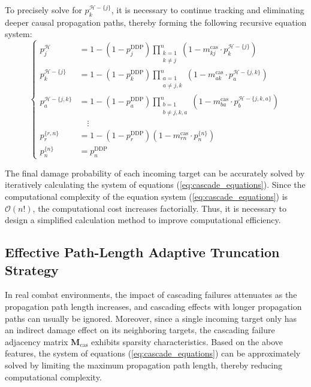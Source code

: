 \documentclass[lettersize,journal]{IEEEtran}
\begin{document}
To precisely solve for $p_k^{\mathcal{H}-\{j\}}$, it is necessary to continue tracking and eliminating deeper causal propagation paths, thereby forming the following recursive equation system:
\begin{equation}
\left\{
\begin{aligned}
p_j^{\mathcal{H}} &= 1 - (1-p_j^{\text{DDP}}) \prod_{\substack{k = 1 \\ k \ne j}}^{n} (1-m_{kj}^{\text{cas}} \cdot p_k^{\mathcal{H}-\{j\}}) \\[1ex]
p_k^{\mathcal{H}-\{j\}} &= 1 - (1-p_k^{\text{DDP}}) \prod_{\substack{a = 1 \\ a \ne j,k}}^{n} (1-m_{ak}^{\text{cas}} \cdot p_a^{\mathcal{H}-\{j,k\}}) \\[1ex]
p_a^{\mathcal{H}-\{j,k\}} &= 1 - (1-p_a^{\text{DDP}}) \prod_{\substack{b = 1 \\ b \ne j,k,a}}^{n} (1-m_{ba}^{\text{cas}} \cdot p_b^{\mathcal{H}-\{j,k,a\}}) \\[1ex]
&\quad \vdots \\[1ex]
p_r^{\{r,n\}} &= 1 - (1-p_r^{\text{DDP}}) (1-m_{rn}^{\text{cas}} \cdot p_n^{\{n\}}) \\[1ex]
p_n^{\{n\}} &= p_n^{\text{DDP}}
\end{aligned}
\right.
\label{eq:cascade_equations}
\end{equation}

The final damage probability of each incoming target can be accurately solved by iteratively calculating the system of equations (\ref{eq:cascade_equations}). Since the computational complexity of the equation system (\ref{eq:cascade_equations}) is $\mathcal{O}(n!)$, the computational cost increases factorially. Thus, it is necessary to design a simplified calculation method to improve computational efficiency.


\subsection{Effective Path-Length Adaptive Truncation Strategy}

In real combat environments, the impact of cascading failures attenuates as the propagation path length increases, and cascading effects with longer propagation paths can usually be ignored. Moreover, since a single incoming target only has an indirect damage effect on its neighboring targets, the cascading failure adjacency matrix $\mathbf{M}_{\text{cas}}$ exhibits sparsity characteristics. Based on the above features, the system of equations (\ref{eq:cascade_equations}) can be approximately solved by limiting the maximum propagation path length, thereby reducing computational complexity.
\end{document}
